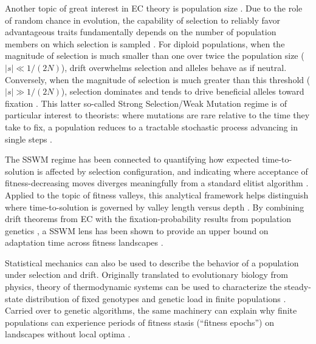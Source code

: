 Another topic of great interest in EC theory is population size \citep{harik1999gamblers,goldberg1991genetic}.
Due to the role of random chance in evolution, the capability of selection to reliably favor advantageous traits fundamentally depends on the number of population members on which selection is sampled \citep{gravel2016selection}.
For diploid populations, when the magnitude of selection is much smaller than one over twice the population size ($|s| \ll 1/(2N)$), drift overwhelms selection and alleles behave as if neutral.  %
Conversely, when the magnitude of selection is much greater than this threshold ($|s| \gg 1/(2N)$), selection dominates and tends to drive beneficial alleles toward fixation \citep{crow2017introduction}.
This latter so-called Strong Selection/Weak Mutation regime is of particular interest to theorists: where mutations are rare relative to the time they take to fix, a population reduces to a tractable stochastic process advancing in single steps \citep{gillespie1983simple}.

The SSWM regime has been connected to quantifying how expected time-to-solution is affected by selection configuration, and indicating where acceptance of fitness-decreasing moves diverges meaningfully from a standard elitist algorithm \citep{paixao2016towards}.
Applied to the topic of fitness valleys, this analytical framework helps distinguish where time-to-solution is governed by valley length versus depth \citep{oliveto2017how}.
By combining drift theorems from EC \citep{he2001drift,lehre2013general,johannsen2010random,oliveto2010simplified,rowe2014jonathan} with the fixation-probability results from population genetics \citep{kimura1962probability}, a SSWM lens has been shown to provide an upper bound on adaptation time across fitness landscapes \citep{heredia2017selection}.

Statistical mechanics can also be used to describe the behavior of a population under selection and drift.
Originally translated to evolutionary biology from physics, theory of thermodynamic systems can be used to characterize the steady-state distribution of fixed genotypes and genetic load in finite populations \citep{sella2005application}.
Carried over to genetic algorithms, the same machinery can explain why finite populations can experience periods of fitness stasis (``fitness epochs'') on landscapes without local optima \citep{vannimwegen1999statistical}.

